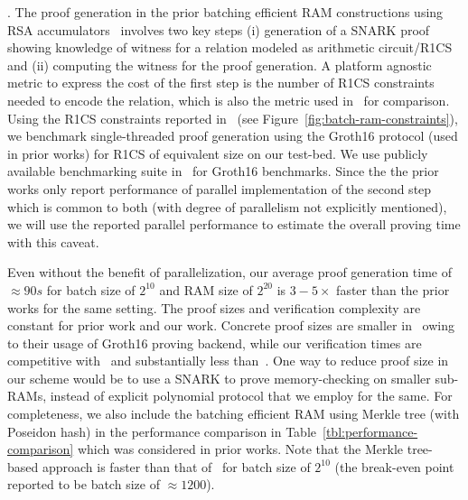 . The proof generation in the prior batching efficient RAM constructions
using RSA accumulators~\cite{USENIX:OWWB20,CCS:CFHKKO22} involves two key steps (i) generation of a SNARK
proof showing knowledge of witness for a relation modeled as arithmetic circuit/R1CS and (ii) computing the witness
for the proof generation. A platform agnostic metric to express the cost of the first step is the number of R1CS
constraints needed to encode the relation, which is also the metric used in~\cite{CCS:CFHKKO22} for comparison.
Using the R1CS constraints reported in~\cite{USENIX:OWWB20,CCS:CFHKKO22} (see Figure~\ref{fig:batch-ram-constraints}),
we benchmark single-threaded proof generation
using the \textsf{Groth16} protocol (used in prior works) for R1CS of equivalent size on our test-bed. We use publicly
available benchmarking suite in~\cite{ark-groth-16} for \textsf{Groth16} benchmarks. Since the
the prior works only report performance of parallel implementation of the second step which is common to both (with
degree of parallelism not explicitly mentioned), we will use the reported parallel performance to estimate the
overall proving time with this caveat. 

Even without the benefit of parallelization, our average proof generation
time of $\approx 90s$ for batch size of $2^{10}$ and RAM size of $2^{20}$ is $3-5\times$ faster than the prior works
for the same setting. The proof sizes and verification complexity are constant for prior work and our work.
Concrete proof sizes are smaller in~\cite{USENIX:OWWB20,CCS:CFHKKO22} owing to their usage of \textsf{Groth16}
proving backend, while our verification times are competitive with~\cite{USENIX:OWWB20} and substantially
less than~\cite{CCS:CFHKKO22}. One way to reduce proof size in our scheme would be to use a SNARK to prove
memory-checking on smaller sub-RAMs, instead of explicit polynomial protocol that we employ for the same. For
completeness, we also include the batching efficient RAM using Merkle tree (with Poseidon hash) in the performance
comparison in Table~\ref{tbl:performance-comparison} which was considered in prior works. Note that the Merkle
 tree-based approach is faster than that of~\cite{USENIX:OWWB20} for batch size of $2^{10}$ (the break-even
 point reported to be batch size of $\approx 1200$).

